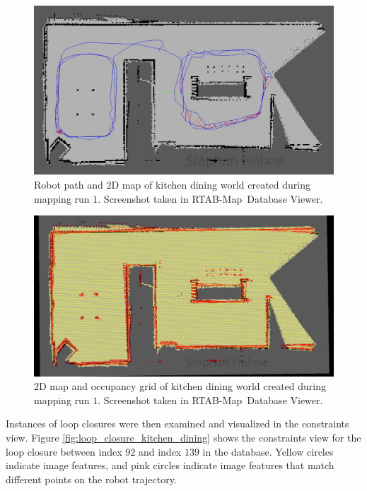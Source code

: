 \documentclass[10pt, journal, compsoc]{IEEEtran}
\newcommand{\rtab}{RTAB-Map}
\begin{document}
\begin{figure}[thpb]
      \centering
      \includegraphics[width=\columnwidth]{images/graph_view_kitchen_dining_small.jpg}
      \caption{Robot path and 2D map of kitchen dining world created during mapping run $1$. Screenshot taken in \rtab\ Database Viewer.}
      \label{fig:graph_view_kitchen_dining_small}
\end{figure}

\begin{figure}[thpb]
      \centering
      \includegraphics[width=\columnwidth]{images/occupancy_grid_kitchen_dining.jpg}
      \caption{2D map and occupancy grid of kitchen dining world created during mapping run $1$. Screenshot taken in \rtab\ Database Viewer.}
      \label{fig:occupancy_grid_kitchen_dining}
\end{figure}

Instances of loop closures were then examined and visualized in the constraints view. Figure \ref{fig:loop_closure_kitchen_dining} shows the constraints view for the loop closure between index $92$ and index $139$ in the database. Yellow circles indicate image features, and pink circles indicate image features that match different points on the robot trajectory.
\end{document}
